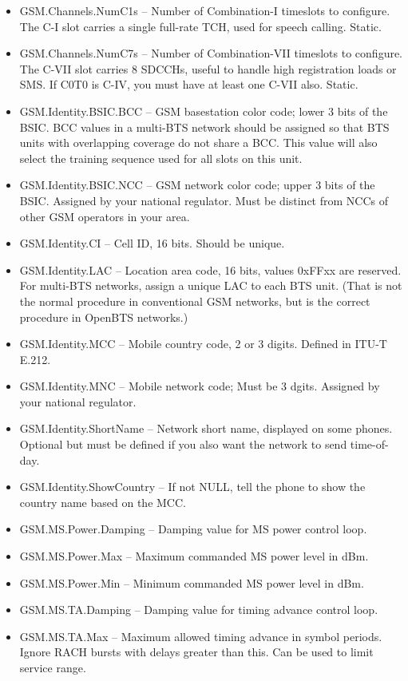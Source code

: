 \documentclass[11pt,openany]{book}
\begin{document}
\begin{itemize}
\item GSM.Channels.NumC1s -- Number of Combination-I timeslots to configure.  The C-I slot carries a single full-rate TCH, used for speech calling.  Static.
\item GSM.Channels.NumC7s -- Number of Combination-VII timeslots to configure.  The C-VII slot carries 8 SDCCHs, useful to handle high registration loads or SMS.  If C0T0 is C-IV, you must have at least one C-VII also.  Static.
\item GSM.Identity.BSIC.BCC -- GSM basestation color code; lower 3 bits of the BSIC.  BCC values in a multi-BTS network should be assigned so that BTS units with overlapping coverage do not share a BCC.  This value will also select the training sequence used for all slots on this unit.
\item GSM.Identity.BSIC.NCC -- GSM network color code; upper 3 bits of the BSIC.  Assigned by your national regulator.  Must be distinct from NCCs of other GSM operators in your area.
\item GSM.Identity.CI -- Cell ID, 16 bits.  Should be unique.
\item GSM.Identity.LAC -- Location area code, 16 bits, values 0xFFxx are reserved.  For multi-BTS networks, assign a unique LAC to each BTS unit.  (That is not the normal procedure in conventional GSM networks, but is the correct procedure in OpenBTS networks.)
\item GSM.Identity.MCC -- Mobile country code, 2 or 3 digits.  Defined in ITU-T E.212.
\item GSM.Identity.MNC -- Mobile network code; Must be 3 dgits.  Assigned by your national regulator.
\item GSM.Identity.ShortName -- Network short name, displayed on some phones.  Optional but must be defined if you also want the network to send time-of-day.
\item GSM.Identity.ShowCountry -- If not NULL, tell the phone to show the country name based on the MCC.
\item GSM.MS.Power.Damping -- Damping value for MS power control loop.
\item GSM.MS.Power.Max -- Maximum commanded MS power level in dBm.
\item GSM.MS.Power.Min -- Minimum commanded MS power level in dBm.
\item GSM.MS.TA.Damping -- Damping value for timing advance control loop.
\item GSM.MS.TA.Max -- Maximum allowed timing advance in symbol periods.  Ignore RACH bursts with delays greater than this.  Can be used to limit service range.

\end{itemize}
\end{document}
